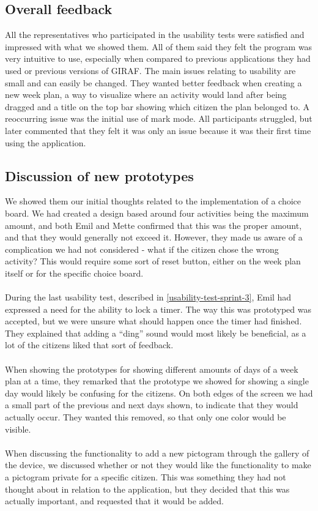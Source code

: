 \subsection{Overall feedback}
All the representatives who participated in the usability tests were satisfied and impressed with what we showed them.
All of them said they felt the program was very intuitive to use, especially when compared to previous applications they had used or previous versions of GIRAF.
The main issues relating to usability are small and can easily be changed.
They wanted better feedback when creating a new week plan, a way to visualize where an activity would land after being dragged and a title on the top bar showing which citizen the plan belonged to. 
A reoccurring issue was the initial use of mark mode.
All participants struggled, but later commented that they felt it was only an issue because it was their first time using the application.

\subsection{Discussion of new prototypes}
We showed them our initial thoughts related to the implementation of a choice board.
We had created a design based around four activities being the maximum amount, and both Emil and Mette confirmed that this was the proper amount, and that they would generally not exceed it. 
However, they made us aware of a complication we had not considered - what if the citizen chose the wrong activity?
This would require some sort of reset button, either on the week plan itself or for the specific choice board.
\\\\
During the last usability test, described in \autoref{usability-test-sprint-3}, Emil had expressed a need for the ability to lock a timer.
The way this was prototyped was accepted, but we were unsure what should happen once the timer had finished.
They explained that adding a “ding” sound would most likely be beneficial, as a lot of the citizens liked that sort of feedback.
\\\\
When showing the prototypes for showing different amounts of days of a week plan at a time, they remarked that the prototype we showed for showing a single day would likely be confusing for the citizens.
On both edges of the screen we had a small part of the previous and next days shown, to indicate that they would actually occur.
They wanted this removed, so that only one color would be visible.
\\\\
When discussing the functionality to add a new pictogram through the gallery of the device, we discussed whether or not they would like the functionality to make a pictogram private for a specific citizen.
This was something they had not thought about in relation to the application, but they decided that this was actually important, and requested that it would be added.

 	          
